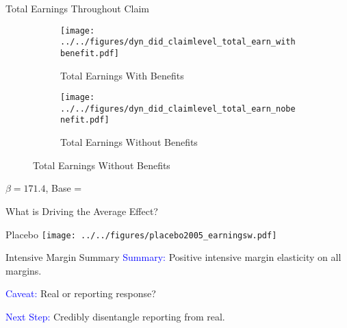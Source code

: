 \documentclass{beamer}
\begin{document}
\begin{frame}{Total Earnings Throughout Claim}
\begin{figure} \centering
	\begin{subfigure}{.49\textwidth}\centering\caption{ \footnotesize Total Earnings With Benefits }\label{map2}
	\texttt{[image: ../../figures/dyn\_did\_claimlevel\_total\_earn\_withbenefit.pdf]}	
	\end{subfigure}
	\begin{subfigure}{.49\textwidth}\centering\caption{ \footnotesize Total Earnings Without Benefits }\label{map2}
		\texttt{[image: ../../figures/dyn\_did\_claimlevel\_total\_earn\_nobenefit.pdf]}	
	\end{subfigure}
\end{figure}
$\beta = 171.4$, Base =
\end{frame}

\begin{frame}{What is Driving the Average Effect?}
\end{frame}

\begin{frame}{Placebo}
		\texttt{[image: ../../figures/placebo2005\_earningsw.pdf]}	
\end{frame}

\begin{frame}{Intensive Margin Summary}
\textcolor{blue}{Summary:} Positive intensive margin elasticity on all margins. 

\bigskip
\bigskip

\textcolor{blue}{Caveat:} Real or reporting response?

\bigskip
\bigskip

\textcolor{blue}{Next Step:} Credibly disentangle reporting from real.

\end{frame}
\end{document}

